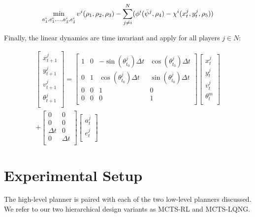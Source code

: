 \begin{small}
\begin{multline} \label{eq:lqng_obj}
    \min_{a^i_{1}, e^i_{1}, ..., a^i_{\Bar{\delta}}, e^i_{\Bar{\delta}}}
    \upsilon^i(\rho_1, \rho_2,\rho_3)
    -\sum_{j \neq i}^{N}  (\phi^i(\Bar{\psi}^j, \rho_4) - \chi^i(x^j_t, y^j_t, \rho_5))
\end{multline}
\end{small}

Finally, the linear dynamics are time invariant and apply for all players $j \in N$:

\begin{small}
\begin{multline} \label{eq:lqng_dyn}
\begin{bmatrix}
x^j_{t+1} \\
y^j_{t+1} \\
v^j_{t+1} \\
\theta^j_{t+1} \\
\end{bmatrix} = 
\begin{bmatrix} 
	1 & 0 & -\sin(\theta^j_{t_0})\Delta t & \cos(\theta^j_{t_0})\Delta t\\
	0 & 1 & \cos(\theta^j_{t_0})\Delta t & \sin(\theta^j_{t_0})\Delta t\\
	0 & 0 & 1 & 0\\
	0 & 0 & 0 & 1\\
	\end{bmatrix}
\begin{bmatrix}
x^j_{t} \\
y^j_{t} \\
v^j_{t} \\
\theta^m_{t} \\
\end{bmatrix} \\ +
\begin{bmatrix} 
	0 & 0 \\
	0 & 0 \\
	\Delta t & 0 \\
	0 & \Delta t \\
	\end{bmatrix}
	\begin{bmatrix} 
	a^j_t  \\
	e^j_t \\
	\end{bmatrix}
\end{multline}
\end{small}
\section{Experimental Setup}
The high-level planner is paired with each of the two low-level planners discussed. We refer to our two hierarchical design variants as MCTS-RL and MCTS-LQNG. 
